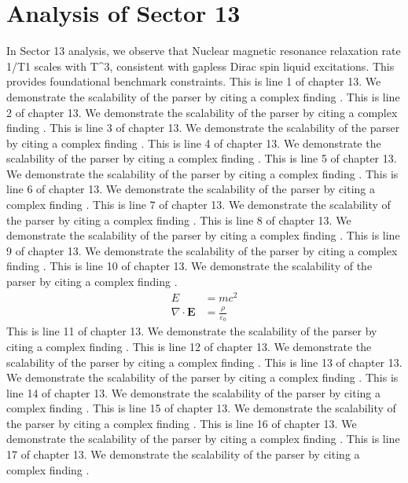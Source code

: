 \chapter{Analysis of Sector 13}

In Sector 13 analysis, we observe that Nuclear magnetic resonance relaxation rate 1/T1 scales with T^3, consistent with gapless Dirac spin liquid excitations. This provides foundational benchmark constraints.
This is line 1 of chapter 13. We demonstrate the scalability of the parser by citing a complex finding \cite{ref13_1}.
This is line 2 of chapter 13. We demonstrate the scalability of the parser by citing a complex finding \cite{ref13_2}.
This is line 3 of chapter 13. We demonstrate the scalability of the parser by citing a complex finding \cite{ref13_3}.
This is line 4 of chapter 13. We demonstrate the scalability of the parser by citing a complex finding \cite{ref13_4}.
This is line 5 of chapter 13. We demonstrate the scalability of the parser by citing a complex finding \cite{ref13_5}.
This is line 6 of chapter 13. We demonstrate the scalability of the parser by citing a complex finding \cite{ref13_6}.
This is line 7 of chapter 13. We demonstrate the scalability of the parser by citing a complex finding \cite{ref13_7}.
This is line 8 of chapter 13. We demonstrate the scalability of the parser by citing a complex finding \cite{ref13_8}.
This is line 9 of chapter 13. We demonstrate the scalability of the parser by citing a complex finding \cite{ref13_9}.
This is line 10 of chapter 13. We demonstrate the scalability of the parser by citing a complex finding \cite{ref13_10}.
\begin{align*}
  E &= mc^2 \\
  \nabla \cdot \mathbf{E} &= \frac{\rho}{\varepsilon_0}
\end{align*}
This is line 11 of chapter 13. We demonstrate the scalability of the parser by citing a complex finding \cite{ref13_11}.
This is line 12 of chapter 13. We demonstrate the scalability of the parser by citing a complex finding \cite{ref13_12}.
This is line 13 of chapter 13. We demonstrate the scalability of the parser by citing a complex finding \cite{ref13_13}.
This is line 14 of chapter 13. We demonstrate the scalability of the parser by citing a complex finding \cite{ref13_14}.
This is line 15 of chapter 13. We demonstrate the scalability of the parser by citing a complex finding \cite{ref13_15}.
This is line 16 of chapter 13. We demonstrate the scalability of the parser by citing a complex finding \cite{ref13_16}.
This is line 17 of chapter 13. We demonstrate the scalability of the parser by citing a complex finding \cite{ref13_17}.
